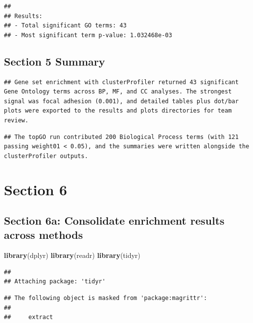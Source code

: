 \documentclass[
]{article}
\newenvironment{Shaded}{\begin{snugshade}}{\end{snugshade}}
\newcommand{\FunctionTok}[1]{\textcolor[rgb]{0.13,0.29,0.53}{\textbf{#1}}}
\newcommand{\NormalTok}[1]{#1}
\begin{document}
\begin{verbatim}
## 
## Results:
## - Total significant GO terms: 43 
## - Most significant term p-value: 1.032468e-03
\end{verbatim}

\subsection{Section 5 Summary}\label{section-5-summary}

\begin{verbatim}
## Gene set enrichment with clusterProfiler returned 43 significant Gene Ontology terms across BP, MF, and CC analyses. The strongest signal was focal adhesion (0.001), and detailed tables plus dot/bar plots were exported to the results and plots directories for team review.
\end{verbatim}

\begin{verbatim}
## The topGO run contributed 200 Biological Process terms (with 121 passing weight01 < 0.05), and the summaries were written alongside the clusterProfiler outputs.
\end{verbatim}

\section{Section 6}\label{section-6}

\subsection{Section 6a: Consolidate enrichment results across
methods}\label{section-6a-consolidate-enrichment-results-across-methods}

\begin{Shaded}
\begin{Highlighting}[]
\FunctionTok{library}\NormalTok{(dplyr)}
\FunctionTok{library}\NormalTok{(readr)}
\FunctionTok{library}\NormalTok{(tidyr)}
\end{Highlighting}
\end{Shaded}

\begin{verbatim}
## 
## Attaching package: 'tidyr'
\end{verbatim}

\begin{verbatim}
## The following object is masked from 'package:magrittr':
## 
##     extract
\end{verbatim}
\end{document}
